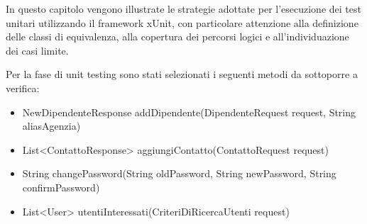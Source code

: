 In questo capitolo vengono illustrate le strategie adottate per l’esecuzione dei test unitari utilizzando il framework xUnit, con particolare attenzione alla definizione delle classi di equivalenza, alla copertura dei percorsi logici e all’individuazione dei casi limite.

Per la fase di unit testing sono stati selezionati i seguenti metodi da sottoporre a verifica:

\begin{itemize}
	\item NewDipendenteResponse addDipendente(DipendenteRequest request, String aliasAgenzia)
	\item List<ContattoResponse> aggiungiContatto(ContattoRequest request)
	\item String changePassword(String oldPassword, String newPassword, String confirmPassword)
	\item List<User> utentiInteressati(CriteriDiRicercaUtenti request)
\end{itemize}







